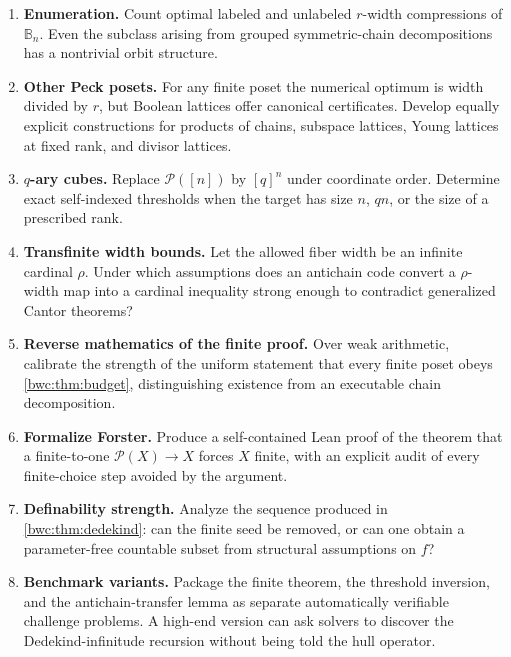 \documentclass[11pt,letterpaper]{article}
\numberwithin{equation}{section}
\theoremstyle{plain}
\theoremstyle{definition}
\theoremstyle{remark}
\newcommand{\Pow}{\mathcal P}
\newcommand{\B}{\mathbb B}
\begin{document}
\begin{enumerate}
\item \label{bwc:q:enumeration}\textbf{Enumeration.}  Count optimal labeled and unlabeled
      $r$-width compressions of $\B_n$.  Even the subclass arising from grouped
      symmetric-chain decompositions has a nontrivial orbit structure.

\item \label{bwc:q:peck}\textbf{Other Peck posets.}  For any finite poset the numerical optimum
      is width divided by $r$, but Boolean lattices offer canonical
      certificates.  Develop equally explicit constructions for products of
      chains, subspace lattices, Young lattices at fixed rank, and divisor
      lattices.

\item \label{bwc:q:qary}\textbf{$q$-ary cubes.}  Replace $\Pow([n])$ by $[q]^n$ under coordinate
      order.  Determine exact self-indexed thresholds when the target has
      size $n$, $qn$, or the size of a prescribed rank.

\item \label{bwc:q:transfinite}\textbf{Transfinite width bounds.}  Let the allowed fiber width be an
      infinite cardinal $\rho$.  Under which assumptions does an antichain
      code convert a $\rho$-width map into a cardinal inequality strong enough
      to contradict generalized Cantor theorems?

\item \label{bwc:q:reverse}\textbf{Reverse mathematics of the finite proof.}  Over weak arithmetic,
      calibrate the strength of the uniform statement that every finite poset
      obeys \cref{bwc:thm:budget}, distinguishing existence from an executable
      chain decomposition.

\item \label{bwc:q:forster}\textbf{Formalize Forster.}  Produce a self-contained Lean proof of the
      theorem that a finite-to-one $\Pow(X)\to X$ forces $X$ finite, with an
      explicit audit of every finite-choice step avoided by the argument.

\item \label{bwc:q:definability}\textbf{Definability strength.}  Analyze the sequence produced in
      \cref{bwc:thm:dedekind}: can the finite seed be removed, or can one obtain a
      parameter-free countable subset from structural assumptions on $f$?

\item \label{bwc:q:benchmark}\textbf{Benchmark variants.}  Package the finite theorem, the threshold
      inversion, and the antichain-transfer lemma as separate automatically
      verifiable challenge problems.  A high-end version can ask solvers to
      discover the Dedekind-infinitude recursion without being told the hull
      operator.
\end{enumerate}
\end{document}
